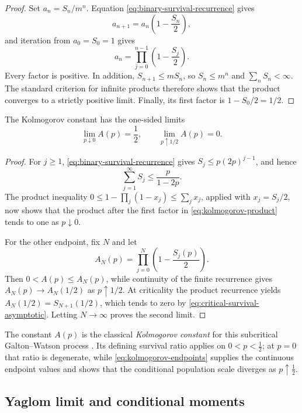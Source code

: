 \begin{proof}
Set $a_n=S_n/m^n$.  Equation \eqref{eq:binary-survival-recurrence} gives
\[
  a_{n+1}=a_n\left(1-\frac{S_n}{2}\right),
\]
and iteration from $a_0=S_0=1$ gives
\[
  a_n=\prod_{j=0}^{n-1}\left(1-\frac{S_j}{2}\right).
\]
Every factor is positive.  In addition, $S_{n+1}\le mS_n$, so $S_n\le m^n$ and $\sum_n S_n<\infty$.  The standard criterion for infinite products therefore shows that the product converges to a strictly positive limit.  Finally, its first factor is $1-S_0/2=1/2$.
\end{proof}

\begin{corollary}
The Kolmogorov constant has the one-sided limits
\begin{equation}
  \lim_{p\downarrow0}A(p)=\frac12,
  \qquad
  \lim_{p\uparrow1/2}A(p)=0.
  \label{eq:kolmogorov-endpoints}
\end{equation}
\end{corollary}

\begin{proof}
For $j\ge1$, \cref{eq:binary-survival-recurrence} gives $S_j\le p(2p)^{j-1}$, and hence
\[
  \sum_{j=1}^{\infty}S_j\le\frac{p}{1-2p}.
\]
The product inequality $0\le1-\prod_j(1-x_j)\le\sum_j x_j$, applied with $x_j=S_j/2$, now shows that the product after the first factor in \cref{eq:kolmogorov-product} tends to one as $p\downarrow0$.

For the other endpoint, fix $N$ and let
\[
  A_N(p)=\prod_{j=0}^{N}\left(1-\frac{S_j(p)}{2}\right).
\]
Then $0<A(p)\le A_N(p)$, while continuity of the finite recurrence gives $A_N(p)\to A_N(1/2)$ as $p\uparrow1/2$.  At criticality the product recurrence yields $A_N(1/2)=S_{N+1}(1/2)$, which tends to zero by \cref{eq:critical-survival-asymptotic}.  Letting $N\to\infty$ proves the second limit.
\end{proof}

The constant $A(p)$ is the classical \emph{Kolmogorov constant} for this subcritical Galton--Watson process \cite{Pakes2026}.  Its defining survival ratio applies on $0<p<\tfrac12$; at $p=0$ that ratio is degenerate, while \cref{eq:kolmogorov-endpoints} supplies the continuous endpoint values and shows that the conditional population scale diverges as $p\uparrow\tfrac12$.

\subsection{Yaglom limit and conditional moments}
\label{sec:yaglom}

